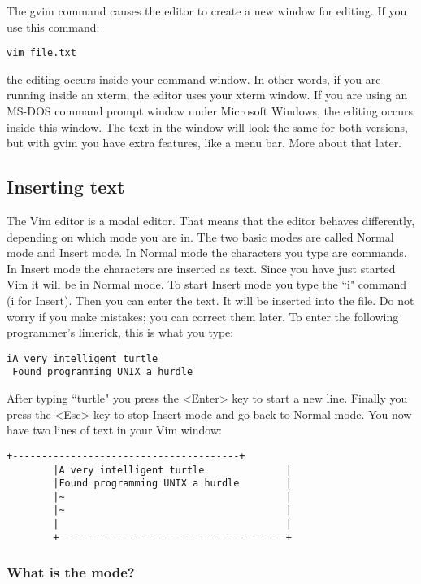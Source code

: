 The gvim command causes the editor to create a new window for editing.
If you use this command:

 \begin{Verbatim}[samepage=true]
 vim file.txt
 \end{Verbatim}

the editing occurs inside your command window.
In other words, if you are running inside an xterm, the editor uses your xterm window.
If you are using an MS-DOS command prompt window under Microsoft Windows, the editing occurs inside this window.
The text in the window will look the same for both versions, but with gvim you have extra features, like a menu bar.
More about that later.

\subsection{Inserting text}
The Vim editor is a modal editor.
That means that the editor behaves differently, depending on which mode you are in.
The two basic modes are called Normal mode and Insert mode.
In Normal mode the characters you type are commands.
In Insert mode the characters are inserted as text.
Since you have just started Vim it will be in Normal mode.
To start Insert mode you type the ``i" command (i for Insert).
Then you can enter the text.
It will be inserted into the file.
Do not worry if you make mistakes; you can correct them later.
To enter the following programmer's limerick, this is what you type:

 \begin{Verbatim}[samepage=true]
 iA very intelligent turtle
 Found programming UNIX a hurdle
 \end{Verbatim}

After typing ``turtle" you press the <Enter> key to start a new line.
Finally you press the <Esc> key to stop Insert mode and go back to Normal mode.
You now have two lines of text in your Vim window:

		\begin{Verbatim}[samepage=true]
		+---------------------------------------+
		|A very intelligent turtle              |
		|Found programming UNIX a hurdle        |
		|~                                      |
		|~                                      |
		|                                       |
		+---------------------------------------+
		\end{Verbatim}

\subsubsection{What is the mode?}

